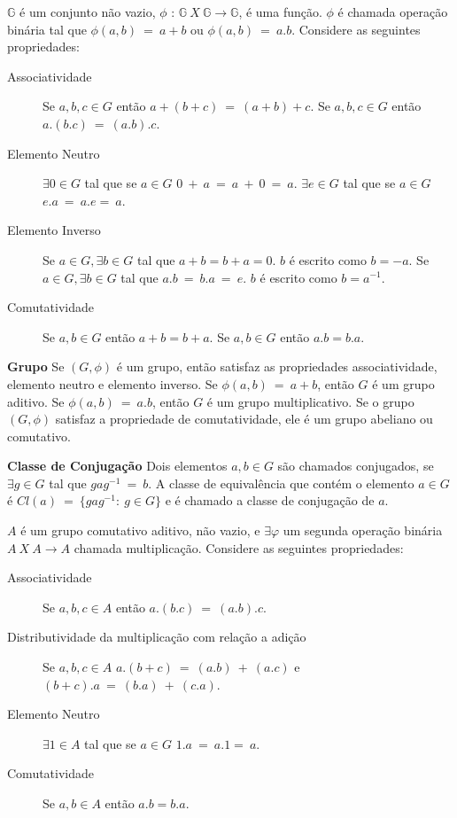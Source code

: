 \begin{definition} $\mathbb{G}$ é um conjunto não vazio, $\phi$ : $\mathbb{G}\ X\ \mathbb{G} \rightarrow \mathbb{G}$, é uma função. $\phi$ é chamada operação binária tal que  $\phi(a,b)\ =\ a+b $ ou $\phi(a,b)\ =\ a.b$. Considere as seguintes propriedades:
  \begin{description}
     \item [Associatividade] Se $a, b, c \in G$ então $a+(b+c)\ =\ (a+b)+c$. Se $a, b, c \in G$ então $a.(b.c)\ =\ (a.b).c$. 
     \item [Elemento Neutro] $\exists 0 \in G$ tal que se $a \in G$ $0\ +\ a\ =\ a\ +\ 0\ =\ a$. $\exists e \in G$ tal que se $a \in G$ $e.a\ =\ a.e =\ a$.
     \item [Elemento Inverso]  Se $a \in G, \exists b \in G$ tal que $a + b = b + a = 0$. $b$ é escrito como $b = -a$. Se $a \in G, \exists b \in G$ tal que $a.b\ =\ b.a\ =\ e$. $b$ é escrito como $b = a^{-1}$.
     \item [Comutatividade] Se $a, b \in G$ então $a + b = b + a$. Se $a, b \in G$ então $a . b = b . a$.
  \end{description}
\end{definition}

\begin{definition} {\bf Grupo} \label{grupo}  Se $(G, \phi)$ é um grupo, então satisfaz as propriedades associatividade, elemento neutro e elemento inverso. Se $\phi(a,b)\ =\ a+b$, então $G$ é um grupo aditivo. Se $\phi(a,b)\ =\ a.b$, então $G$ é um grupo multiplicativo. Se o grupo $(G, \phi)$ satisfaz a propriedade de comutatividade, ele é um grupo abeliano ou comutativo.
\end{definition}

\begin{definition} {\bf Classe de Conjugação} \label{clconj}  Dois elementos $a, b \in G$ são chamados conjugados, se $\exists g \in G$ tal que $gag^{-1}\ =\ b$. A classe de equivalência que contém o elemento $a \in G$ é $Cl(a)\ =\ \{gag^{-1}:\ g \in G \}$ e é chamado a classe de conjugação de $a$.
\end{definition}

\begin{definition} $A$ é um grupo comutativo aditivo, não vazio, e $\exists \varphi$ um segunda operação binária $A\ X\ A \rightarrow A$ chamada multiplicação. Considere as seguintes propriedades:
  \begin{description}
     \item [Associatividade] Se $a, b, c \in A$ então $a.(b.c)\ =\ (a.b).c$.
     \item [Distributividade da multiplicação com relação a adição] Se $a, b, c \in A$ $a.(b+c)\ =\ (a.b)\ +\ (a.c)$ e $(b+c).a\ =\ (b.a)\ +\ (c.a)$.
     \item [Elemento Neutro] $\exists 1 \in A$ tal que se $a \in G$ $1.a\ =\ a.1 =\ a$.
     \item [Comutatividade] Se $a, b \in A$ então $a . b = b . a$.
  \end{description}
\end{definition}

